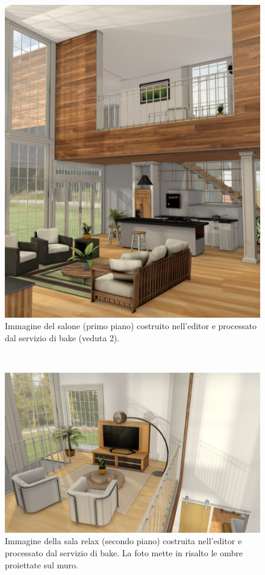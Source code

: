 \\
\begin{figure}[htb]
 \centering
 \includegraphics[width=1\linewidth]{images/chapter_prove_sperimentali/scena2_bake.png}\hfill
 \caption[Ambiente virtuale: Salone primo piano, veduta 2]{Immagine del salone (primo piano) costruito nell'editor e processato dal servizio di bake (veduta 2).}
 \label{fig:prove_sperimentali_qualita_visiva_scena2_bake}
\end{figure}
\\
\begin{figure}[htb]
 \centering
 \includegraphics[width=1\linewidth]{images/chapter_prove_sperimentali/scena_1_pianosup_hobby.png}\hfill
 \caption[Ambiente virtuale: Sala relax secondo piano, veduta 1]{Immagine della sala relax (secondo piano) costruita nell'editor e processato dal servizio di bake. La foto mette in risalto le ombre proiettate sul muro.}
 \label{fig:prove_sperimentali_qualita_visiva_scena_hobby}
\end{figure}
